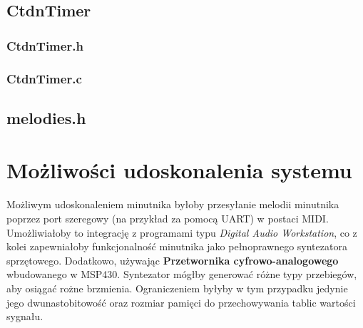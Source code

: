 \documentclass[fleqn]{article}
\begin{document}
\noindent\begin{minipage}[t]{.45\textwidth}
\subsection{CtdnTimer}
\subsubsection{CtdnTimer.h}

\subsubsection{CtdnTimer.c}

\end{minipage}\hfill
\noindent\begin{minipage}[t]{.45\textwidth}
\subsection{melodies.h}

\end{minipage}\hfill

\pagebreak

\section{Możliwości udoskonalenia systemu}
Możliwym udoskonaleniem minutnika byłoby przesyłanie melodii minutnika poprzez port szeregowy (na przykład za pomocą UART) w postaci MIDI. Umożliwiałoby to integrację z programami typu \textit{Digital Audio Workstation}, co z kolei zapewniałoby funkcjonalność minutnika jako pełnoprawnego syntezatora sprzętowego. Dodatkowo, używając \textbf{Przetwornika cyfrowo-analogowego} wbudowanego w MSP430. Syntezator mógłby generować różne typy przebiegów, aby osiągać rożne brzmienia. Ograniczeniem byłyby w tym przypadku jedynie jego dwunastobitowość oraz rozmiar pamięci do przechowywania tablic wartości sygnału.
\end{document}
